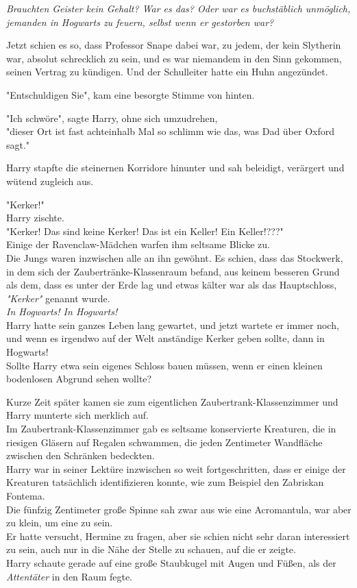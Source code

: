 {\emph{Brauchten Geister kein Gehalt? War es das? Oder war es buchstäblich unmöglich, jemanden in Hogwarts zu feuern, selbst wenn er gestorben war?}

Jetzt schien es so, dass Professor Snape dabei war, zu jedem, der kein Slytherin war, absolut schrecklich zu sein, und es war niemandem in den Sinn gekommen, seinen Vertrag zu kündigen. Und der Schulleiter hatte ein Huhn angezündet.

"Entschuldigen Sie", kam eine besorgte Stimme von hinten.

"Ich schwöre", sagte Harry, ohne sich umzudrehen,\\ "dieser Ort ist fast achteinhalb Mal so schlimm wie das, was Dad über Oxford sagt."

Harry stapfte die steinernen Korridore hinunter und sah beleidigt, verärgert und wütend zugleich aus.

"Kerker!"\\ Harry zischte.\\ "Kerker! Das sind keine Kerker! Das ist ein Keller! Ein Keller!???"\\ Einige der Ravenclaw-Mädchen warfen ihm seltsame Blicke zu.\\ Die Jungs waren inzwischen alle an ihn gewöhnt. Es schien, dass das Stockwerk, in dem sich der Zaubertränke-Klassenraum befand, aus keinem besseren Grund als dem, dass es unter der Erde lag und etwas kälter war als das Hauptschloss, \emph{"Kerker"} genannt wurde.\\ \emph{In Hogwarts! In Hogwarts!}\\ Harry hatte sein ganzes Leben lang gewartet, und jetzt wartete er immer noch, und wenn es irgendwo auf der Welt anständige Kerker geben sollte, dann in Hogwarts!\\ Sollte Harry etwa sein eigenes Schloss bauen müssen, wenn er einen kleinen bodenlosen Abgrund sehen wollte?

Kurze Zeit später kamen sie zum eigentlichen Zaubertrank-Klassenzimmer und Harry munterte sich merklich auf.\\ Im Zaubertrank-Klassenzimmer gab es seltsame konservierte Kreaturen, die in riesigen Gläsern auf Regalen schwammen, die jeden Zentimeter Wandfläche zwischen den Schränken bedeckten.\\ Harry war in seiner Lektüre inzwischen so weit fortgeschritten, dass er einige der Kreaturen tatsächlich identifizieren konnte, wie zum Beispiel den Zabriskan Fontema.\\ Die fünfzig Zentimeter große Spinne sah zwar aus wie eine Acromantula, war aber zu klein, um eine zu sein.\\ Er hatte versucht, Hermine zu fragen, aber sie schien nicht sehr daran interessiert zu sein, auch nur in die Nähe der Stelle zu schauen, auf die er zeigte.\\ Harry schaute gerade auf eine große Staubkugel mit Augen und Füßen, als der \emph{Attentäter} in den Raum fegte.

}
